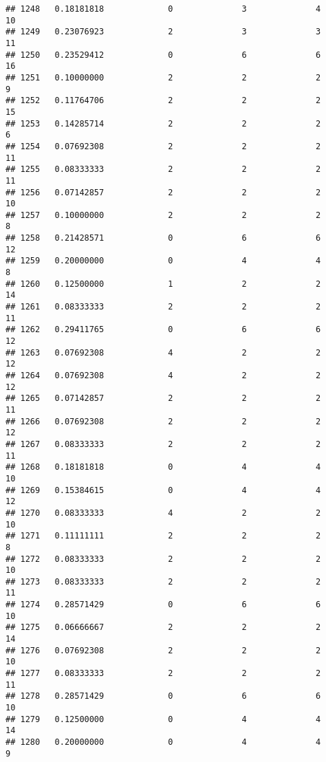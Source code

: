 \documentclass[
]{article}
\begin{document}
\begin{verbatim}
## 1248   0.18181818             0              3              4             10
## 1249   0.23076923             2              3              3             11
## 1250   0.23529412             0              6              6             16
## 1251   0.10000000             2              2              2              9
## 1252   0.11764706             2              2              2             15
## 1253   0.14285714             2              2              2              6
## 1254   0.07692308             2              2              2             11
## 1255   0.08333333             2              2              2             11
## 1256   0.07142857             2              2              2             10
## 1257   0.10000000             2              2              2              8
## 1258   0.21428571             0              6              6             12
## 1259   0.20000000             0              4              4              8
## 1260   0.12500000             1              2              2             14
## 1261   0.08333333             2              2              2             11
## 1262   0.29411765             0              6              6             12
## 1263   0.07692308             4              2              2             12
## 1264   0.07692308             4              2              2             12
## 1265   0.07142857             2              2              2             11
## 1266   0.07692308             2              2              2             12
## 1267   0.08333333             2              2              2             11
## 1268   0.18181818             0              4              4             10
## 1269   0.15384615             0              4              4             12
## 1270   0.08333333             4              2              2             10
## 1271   0.11111111             2              2              2              8
## 1272   0.08333333             2              2              2             10
## 1273   0.08333333             2              2              2             11
## 1274   0.28571429             0              6              6             10
## 1275   0.06666667             2              2              2             14
## 1276   0.07692308             2              2              2             10
## 1277   0.08333333             2              2              2             11
## 1278   0.28571429             0              6              6             10
## 1279   0.12500000             0              4              4             14
## 1280   0.20000000             0              4              4              9

\end{verbatim}
\end{document}

